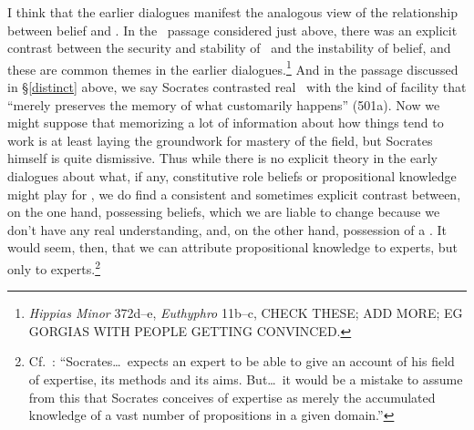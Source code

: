 \documentclass[11pt,letterpaper,oneside]{amsart} %
\begin{document}
I think that the earlier dialogues manifest the analogous view of the relationship between belief and \techne. In the \prot\ passage considered just above, there was an explicit contrast between the security and stability of \techne\ and the instability of belief, and these are common themes in the earlier dialogues.\footnote{\cf \eg \emph{Hippias Minor} 372d--e, \emph{Euthyphro} 11b--c, CHECK THESE; ADD MORE; EG GORGIAS WITH PEOPLE GETTING CONVINCED.} And in the  passage discussed in \S\ref{distinct} above, we say Socrates contrasted real \technh\ with the kind of facility that ``merely preserves the memory of what customarily happens'' (501a). Now we might suppose that memorizing a lot of information about how things tend to work is at least laying the groundwork for mastery of the field, but Socrates himself is quite dismissive. Thus while there is no explicit theory in the early dialogues about what, if any, constitutive role beliefs or propositional knowledge might play for \techne, we do find a consistent and sometimes explicit contrast between, on the one hand, possessing beliefs, which we are liable to change because we don't have any real understanding, and, on the other hand, possession of a \techne. It would seem, then, that we can attribute propositional knowledge to experts, but only to experts.\footnote{Cf.\ \citet[p.\ 132]{asmith1998}: ``Socrates\ldots\ expects an expert to be able to give an account of his field of expertise, its methods and its aims. But\ldots\ it would be a mistake to assume from this that Socrates conceives of expertise as merely the accumulated knowledge of a vast number of propositions in a given domain.''}

\end{document}
